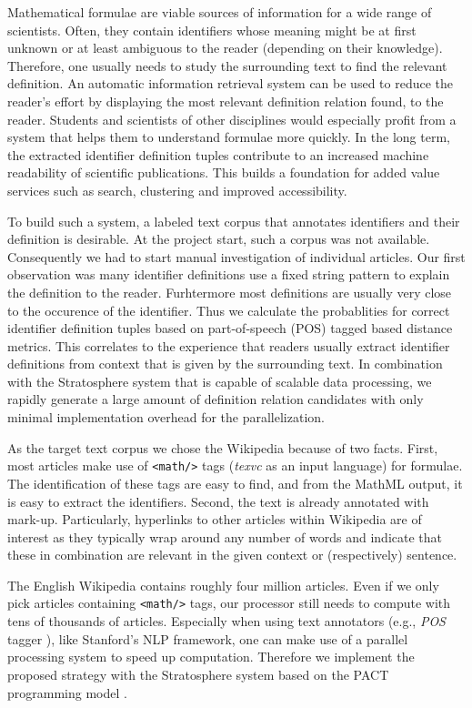 \documentclass[runningheads]{llncs}
\begin{document}
Mathematical formulae are viable sources of information for a wide range of
scientists. Often, they contain identifiers whose meaning might be at first
unknown or at least ambiguous to the reader (depending on their knowledge).
Therefore, one usually needs to study the surrounding text to find the
relevant definition. An automatic information retrieval system can be used to
reduce the reader's effort by displaying the most relevant definition relation
found, to the reader. Students and scientists of other disciplines would
especially profit from a system that helps them to understand formulae more
quickly. In the long term, the extracted identifier definition tuples contribute
to an increased machine readability of scientific publications. This builds a
foundation for added value services such as search, clustering and improved
accessibility.


To build such a system, a labeled text corpus that annotates identifiers and
their definition is desirable. At the project start, such a corpus was not
available.
Consequently we had to start manual investigation of individual articles.
Our first observation was many identifier definitions use a fixed string pattern
to explain the definition to the reader. Furhtermore most
definitions are usually very close to the occurence of the identifier.
Thus we calculate the probablities for correct identifier definition tuples based
on part-of-speech (POS) tagged based distance metrics.
This correlates to the experience that readers usually extract identifier definitions from context
that is given by the surrounding text. In combination with the Stratosphere
system \cite{Alexandrov2010} that is capable of scalable data processing, we
rapidly generate a large amount of definition relation candidates with only
minimal implementation overhead for the parallelization.


As the target text corpus we chose the Wikipedia because of two facts. First,
most articles make use of \texttt{<math/>} tags (\emph{texvc} as an input
language) for formulae. The identification of these tags are easy to find,
and from the MathML output, it is easy to extract the identifiers.
Second, the text is already annotated with mark-up.
Particularly, hyperlinks to other articles within Wikipedia are of
interest as they typically wrap around any number of words and indicate that
these in combination are relevant in the given context or (respectively) sentence.


The English Wikipedia contains roughly four million articles. Even if we only
pick articles containing \texttt{<math/>} tags, our processor still needs to
compute with tens of thousands of articles. Especially when using text
annotators (e.g., \emph{POS} tagger \cite{Rathna96}), like Stanford's NLP
framework, one can make use of a parallel processing system to speed up
computation. Therefore we implement the proposed strategy with the
Stratosphere system based on the PACT programming model \cite{Alexandrov2010}.
\end{document}
